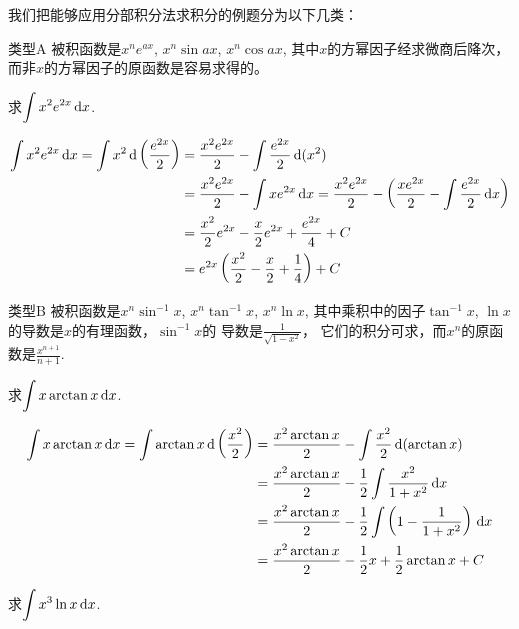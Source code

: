 我们把能够应用分部积分法求积分的例题分为以下几类：

\begin{blk}
 {类型A} 被积函数是$x^ne^{ax}$, $x^n\sin ax$, $x^n\cos ax$, 其中$x$的方幂因子经求微商后降次，而非$x$的方幂因子的原函数是容易求得的。   
\end{blk}

\begin{example}
求$\displaystyle\int x^2 e^{2x}\,{\rm d} x$.
\end{example}

\begin{solution}
\[\begin{split}
    \displaystyle\int x^2 e^{2x}\,{\rm d} x=\int x^2 \,{\rm d}\left(\dfrac{e^{2x}}{2}\right)&=\dfrac{x^2e^{2x}}{2}-\int \dfrac{e^{2x}}{2}\,{\rm d}(x^2)\\
&=\dfrac{x^2e^{2x}}{2}-\int xe^{2x}\,{\rm d} x=\dfrac{x^2e^{2x}}{2}-\left(\dfrac{xe^{2x}}{2}-\int \dfrac{e^{2x}}{2}\,{\rm d} x\right)\\
&=\dfrac{x^2}{2}e^{2x}-\dfrac{x}{2}e^{2x}+\dfrac{e^{2x}}{4}+C\\    
&=e^{2x}\left(\dfrac{x^2}{2}-\dfrac{x}{2}+\dfrac{1}{4}\right)+C
\end{split}\]
\end{solution}

\begin{blk}
    {类型B} 被积函数是$x^n\sin^{-1}x$, $x^n\tan^{-1}x$, $x^n\ln x$, 其中乘积中的因子$\tan^{-1} x$, $\ln x$的导数是$x$的有理函数，$\sin^{-1}x$的
导数是$\frac{1}{\sqrt{1-x^2}}$，
它们的积分可求，而$x^n$的原函数是$\frac{x^{n+1}}{n+1}$.
\end{blk}


\begin{example}
求$\displaystyle\int x\arctan x\,{\rm d} x$.    
\end{example}

\begin{solution}
  \[\begin{split}
    \displaystyle\int x\arctan x\,{\rm d} x=\int \arctan x \,{\rm d}\left(\dfrac{x^2}{2}\right)&=\dfrac{x^2\arctan x}{2}-\int \dfrac{x^2}{2}\,{\rm d}(\arctan x)\\
    &=\dfrac{x^2\arctan x}{2}-\dfrac{1}{2}\int \dfrac{x^2}{1+x^2}\,{\rm d} x\\
    &=\dfrac{x^2\arctan x}{2}-\dfrac{1}{2}\int \left(1-\dfrac{1}{1+x^2}\right)\,{\rm d} x\\
    &=\dfrac{x^2\arctan x}{2}-\dfrac{1}{2}x+\dfrac{1}{2}\arctan x+C
  \end{split}\]  
\end{solution}


\begin{example}
    求$\displaystyle\int x^3\ln x\,{\rm d} x$.
\end{example}

